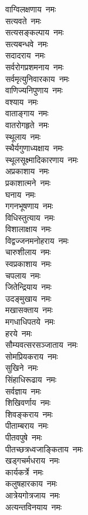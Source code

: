 \begin{flushleft}
\begin{multicols}{2}
वाग्विलक्षणाय~नमः\\
सत्यवते~नमः\\
सत्यसङ्कल्पाय~नमः\\
सत्यबन्धवे~नमः\\
सदादराय~नमः\\
सर्वरोगप्रशमनाय~नमः\\
सर्वमृत्युनिवारकाय~नमः\\
वाणिज्यनिपुणाय~नमः\\
वश्याय~नमः\hfill{}\\
वाताङ्गाय~नमः\\
वातरोगहृते~नमः\\
स्थूलाय~नमः\\
स्थैर्यगुणाध्यक्षाय~नमः\\
स्थूलसूक्ष्मादिकारणाय~नमः\\
अप्रकाशाय~नमः\\
प्रकाशात्मने~नमः\\
घनाय~नमः\\
गगनभूषणाय~नमः\\
विधिस्तुत्याय~नमः\hfill{}\\
विशालाक्षाय~नमः\\
विद्वज्जनमनोहराय~नमः\\
चारुशीलाय~नमः\\
स्वप्रकाशाय~नमः\\
चपलाय~नमः\\
जितेन्द्रियाय~नमः\\
उदङ्मुखाय~नमः\\
मखासक्ताय~नमः\\
मगधाधिपतये~नमः\\
हरये~नमः\hfill{}\\
सौम्यवत्सरसञ्जाताय~नमः\\
सोमप्रियकराय~नमः\\
सुखिने~नमः\\
सिंहाधिरूढाय~नमः\\
सर्वज्ञाय~नमः\\
शिखिवर्णाय~नमः\\
शिवङ्कराय~नमः\\
पीताम्बराय~नमः\\
पीतवपुषे~नमः\\
पीतच्छत्रध्वजाङ्किताय~नमः\hfill{}\\
खड्गचर्मधराय~नमः\\
कार्यकर्त्रे~नमः\\
कलुषहारकाय~नमः\\
आत्रेयगोत्रजाय~नमः\\
अत्यन्तविनयाय~नमः\\

\end{multicols}
\end{flushleft}
